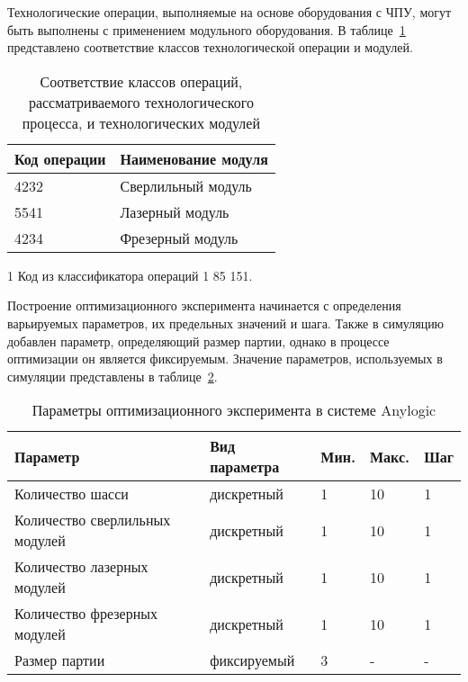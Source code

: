 Технологические операции, выполняемые на основе оборудования с ЧПУ, могут быть выполнены с применением модульного оборудования. В таблице~\cref{tab:cnc-modules} представлено соответствие классов технологической операции и модулей.

\begin{table} [!htb]
	\centering
	\caption{Соответствие классов операций, рассматриваемого технологического процесса, и технологических модулей} \vspace{4pt}
	\label{tab:cnc-modules}
	\begin{threeparttable}
		\begin{tabularx}{\linewidth}{ll}
			\toprule
			\textbf{Код операции\tnote{1}} & \textbf{Наименование модуля} \\
			\midrule
			4232 & Сверлильный модуль \\
			5541 & Лазерный модуль \\
			4234 & Фрезерный модуль \\
			\bottomrule
		\end{tabularx}
		\begin{tablenotes} \footnotesize
			\item [1] Код из классификатора операций 1 85 151.
		\end{tablenotes}
	\end{threeparttable}
\end{table}

Построение оптимизационного эксперимента начинается с определения варьируемых параметров, их предельных значений и шага.  Также в симуляцию добавлен параметр, определяющий размер партии, однако в процессе оптимизации он является фиксируемым. Значение параметров, используемых в симуляции представлены в таблице~\cref{tab:par-anylogic}.

\begin{table} [!htb]
	\centering
	\caption{Параметры оптимизационного эксперимента в системе Anylogic} \vspace{4pt}
	\label{tab:par-anylogic}
	\begin{threeparttable}
		\begin{tabularx}{\linewidth}{lllll}
			\toprule
			Параметр & Вид параметра & Мин. & Макс. & Шаг \\
			\midrule
			Количество шасси               & дискретный  & 1 & 10 & 1 \\
			Количество сверлильных модулей & дискретный  & 1 & 10 & 1 \\
			Количество лазерных модулей    & дискретный  & 1 & 10 & 1 \\
			Количество фрезерных модулей   & дискретный  & 1 & 10 & 1 \\
			Размер партии                  & фиксируемый & 3 &  - & - \\
			\bottomrule
		\end{tabularx}
	\end{threeparttable}
\end{table}

